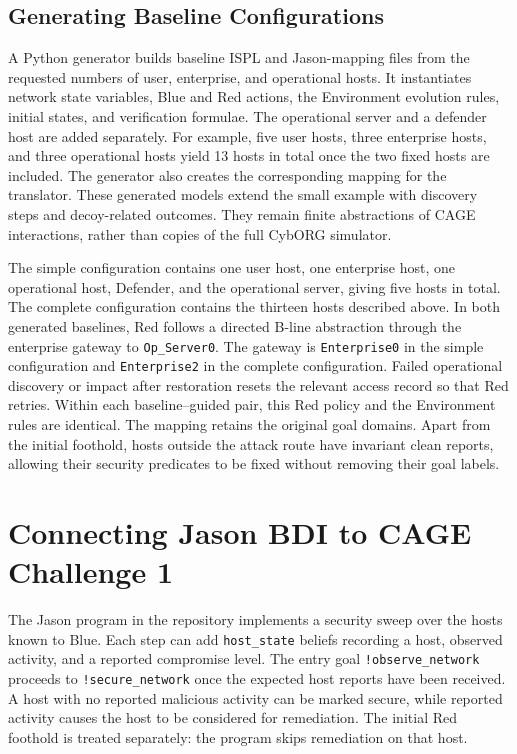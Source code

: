 \documentclass[runningheads]{llncs}
\begin{document}
\subsection{Generating Baseline Configurations}

A Python generator builds baseline ISPL and Jason-mapping files from the requested numbers of user, enterprise, and operational hosts. It instantiates network state variables, Blue and Red actions, the Environment evolution rules, initial states, and verification formulae. The operational server and a defender host are added separately. For example, five user hosts, three enterprise hosts, and three operational hosts yield 13 hosts in total once the two fixed hosts are included. The generator also creates the corresponding mapping for the translator. These generated models extend the small example with discovery steps and decoy-related outcomes. They remain finite abstractions of CAGE interactions, rather than copies of the full CybORG simulator.

The simple configuration contains one user host, one enterprise host,
one operational host, Defender, and the operational server, giving five
hosts in total. The complete configuration contains the thirteen hosts
described above. In both generated baselines, Red follows a directed
B-line abstraction through the enterprise gateway to
\texttt{Op\_Server0}. The gateway is \texttt{Enterprise0} in the simple
configuration and \texttt{Enterprise2} in the complete configuration.
Failed operational discovery or impact after restoration resets the
relevant access record so that Red retries. Within each baseline--guided
pair, this Red policy and the Environment rules are identical.
The mapping retains the original goal domains. Apart from the initial
foothold, hosts outside the attack route have invariant clean reports,
allowing their security predicates
to be fixed without removing their goal labels.


\section{Connecting Jason BDI to CAGE Challenge 1}

The Jason program in the repository implements a security sweep over the hosts known to Blue. Each step can add \texttt{host\_state} beliefs recording a host, observed activity, and a reported compromise level. The entry goal \texttt{!observe\_network} proceeds to \texttt{!secure\_network} once the expected host reports have been received. A host with no reported malicious activity can be marked secure, while reported activity causes the host to be considered for remediation. The initial Red foothold is treated separately: the program skips remediation on that host.
\end{document}
